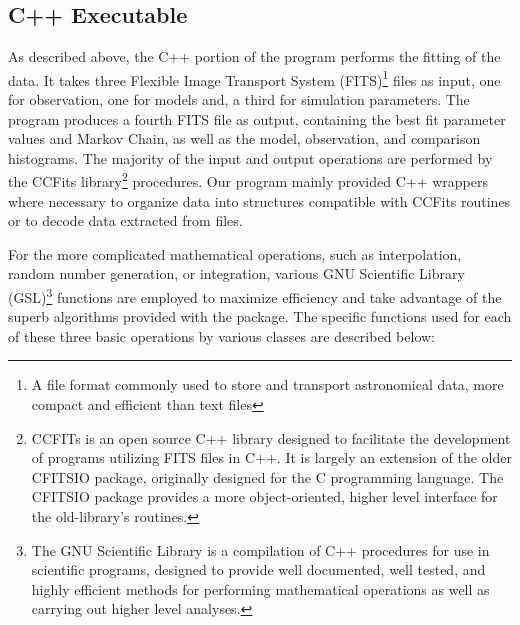 \documentclass[twocolumn,letterpaper,10pt]{article}
\begin{document}
\subsection{C++ Executable}

As described above, the C++ portion of the program performs the fitting of the data. It takes three Flexible Image Transport System (FITS)\footnote{A file format commonly used to store and transport astronomical data, more compact and efficient than text files} files as input, one for observation, one for models and, a third for simulation parameters. The program produces a fourth FITS file as output, containing the best fit parameter values and Markov Chain, as well as the model, observation, and comparison histograms. The majority of the input and output operations are performed by the CCFits library\footnote{CCFITs \citep{CCFITS} is an open source C++ library designed to facilitate the development of programs utilizing FITS files in C++. It is largely an extension of the older CFITSIO \citep{CFITSIO} package, originally designed for the C programming language. The CFITSIO package provides a more object-oriented, higher level interface for the old-library's routines.} procedures. Our program mainly provided C++ wrappers where necessary to organize data into structures compatible with CCFits routines or to decode data extracted from files. 

For the more complicated mathematical operations, such as interpolation, random number generation, or integration, various GNU Scientific Library (GSL)\footnote{The GNU Scientific Library \citep[GSL, ][]{GSL} is a compilation of C++ procedures for use in scientific programs, designed to provide well documented, well tested, and highly efficient methods for performing mathematical operations as well as carrying out higher level analyses.} functions are employed to maximize efficiency and take advantage of the superb algorithms provided with the package. The specific functions used for each of these three basic operations by various classes are described below:
\end{document}

